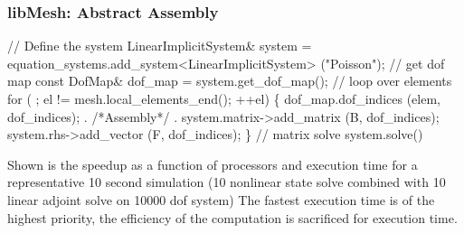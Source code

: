 \documentclass{beamer}
\newcommand{\picdir}{pdffig}
\begin{document}
\begin{frame}[fragile]
\frametitle{libMesh: Abstract Assembly}
\begin{semiverbatim}
\scriptsize
// Define the system
LinearImplicitSystem& system =
  equation_systems.add_system<LinearImplicitSystem> ("Poisson");
// get dof map
const DofMap& dof_map = system.get_dof_map();
// loop over elements
for ( ; el != mesh.local_elements_end(); ++el) 
 \{
      dof_map.dof_indices (elem, dof_indices);
           .
           /*Assembly*/
           .
      system.matrix->add_matrix (B, dof_indices);
      system.rhs->add_vector    (F, dof_indices);
 \}
// matrix solve
system.solve()
\end{semiverbatim}
\end{frame}

\begin{frame}
{\tiny Shown is the speedup as a function of processors
and execution time for a representative 10 second simulation (10 nonlinear
state solve combined with 10 linear adjoint solve on 10000 dof system)
The fastest execution time is of the highest priority,
the efficiency of the computation is sacrificed for execution time.
} 
\end{frame}
\end{document}
